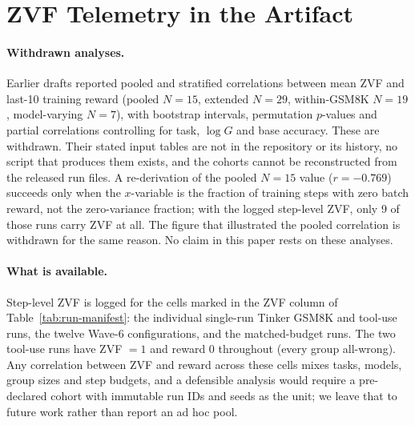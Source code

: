 \section{ZVF Telemetry in the Artifact}
\label{sec:stratified-diagnostics}

\paragraph{Withdrawn analyses.}
Earlier drafts reported pooled and stratified correlations between mean ZVF
and last-10 training reward (pooled $N{=}15$, extended $N{=}29$, within-GSM8K
$N{=}19$, model-varying $N{=}7$), with bootstrap intervals, permutation
$p$-values and partial correlations controlling for task, $\log G$ and base
accuracy. These are withdrawn. Their stated input tables are not in the
repository or its history, no script that produces them exists, and the
cohorts cannot be reconstructed from the released run files. A re-derivation
of the pooled $N{=}15$ value ($r{=}{-}0.769$) succeeds only when the
$x$-variable is the fraction of training steps with zero batch reward, not
the zero-variance fraction; with the logged step-level ZVF, only 9 of those
runs carry ZVF at all. The figure that illustrated the pooled correlation is
withdrawn for the same reason. No claim in this paper rests on these
analyses.

\paragraph{What is available.}
Step-level ZVF is logged for the cells marked in the ZVF column of
Table~\ref{tab:run-manifest}: the individual single-run Tinker GSM8K and
tool-use runs, the twelve Wave-6 configurations, and the matched-budget
runs. The two tool-use runs have ZVF $=1$ and reward $0$ throughout (every
group all-wrong). Any correlation between ZVF and reward across these cells
mixes tasks, models, group sizes and step budgets, and a defensible analysis
would require a pre-declared cohort with immutable run IDs and seeds as the
unit; we leave that to future work rather than report an ad hoc pool.
